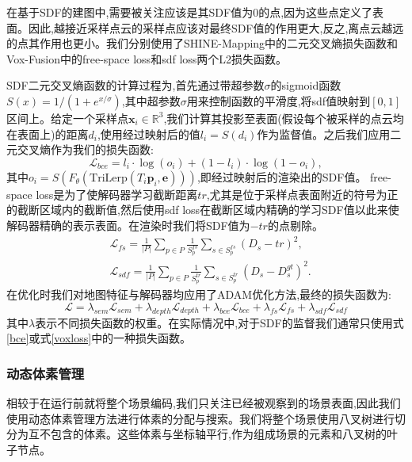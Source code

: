 在基于SDF的建图中,需要被关注应该是其SDF值为0的点,因为这些点定义了表面。因此,越接近采样点云的采样点应该对最终SDF值的作用更大,反之,离点云越远的点其作用也更小。我们分别使用了SHINE-Mapping中的二元交叉熵损失函数和Vox-Fusion中的free-space loss和sdf loss两个L2损失函数。

SDF二元交叉熵函数的计算过程为,首先通过带超参数$\sigma$的sigmoid函数$S(x) = 1/(1 + e^{x/\sigma})$,其中超参数$\sigma$用来控制函数的平滑度,将sdf值映射到$[0,1]$区间上。给定一个采样点$\mathbf{x}_i\in \mathbb{R}^3$,我们计算其投影至表面(假设每个被采样的点云均在表面上)的距离$d_i$,使用经过映射后的值$l_i=S(d_i)$作为监督值。之后我们应用二元交叉熵作为我们的损失函数:
\begin{equation}
    \mathcal{L}_{bce} = l_i\cdot \log(o_i)+(1-l_i)\cdot\log(1-o_i),\label{bce}
\end{equation}
其中$o_i=S(F_\theta(\mbox{TriLerp}(T_i\mathbf{p}_i,\mathbf{e})))$,即经过映射后的渲染出的SDF值。
free-space loss是为了使解码器学习截断距离$tr$,尤其是位于采样点表面附近的符号为正的截断区域内的截断值,然后使用sdf loss在截断区域内精确的学习SDF值以此来使解码器精确的表示表面。在渲染时我们将SDF值为$-tr$的点剔除。
\begin{equation}
    \begin{aligned}
        &\mathcal{L}_{fs} = \frac{1}{|P|}\sum_{p\in P}\frac{1}{S_p^{fs}}\sum_{s\in S_p^{fs}}(D_s-tr)^2,\\
    &\mathcal{L}_{sdf} = \frac{1}{|P|}\sum_{p\in P}\frac{1}{S_p^{tr}}\sum_{s\in S_p^{tr}}(D_s-D_s^{gt})^2.\label{voxloss}
    \end{aligned}
\end{equation}
在优化时我们对地图特征与解码器均应用了ADAM\cite{adam}优化方法,最终的损失函数为:
\begin{equation}
    \mathcal{L} = \lambda_{sem}\mathcal{L}_{sem}+\lambda_{depth}\mathcal{L}_{depth}+\lambda_{bce}\mathcal{L}_{bce}+\lambda_{fs}\mathcal{L}_{fs}+\lambda_{sdf}\mathcal{L}_{sdf}
\end{equation}
其中$\lambda$表示不同损失函数的权重。在实际情况中,对于SDF的监督我们通常只使用式\ref{bce}或式\ref{voxloss}中的一种损失函数。
\subsubsection{动态体素管理}
相较于在运行前就将整个场景编码,我们只关注已经被观察到的场景表面,因此我们使用动态体素管理方法进行体素的分配与搜索。我们将整个场景使用八叉树进行切分为互不包含的体素。这些体素与坐标轴平行,作为组成场景的元素和八叉树的叶子节点。


